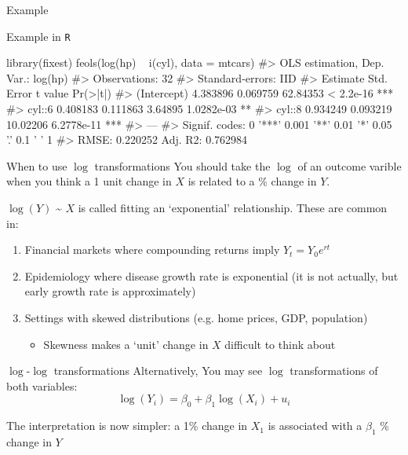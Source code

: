 \documentclass[aspectratio=169,t,11pt,table]{beamer}
\begin{document}


\begin{frame}{Example}

\end{frame}


\begin{frame}{Example in \texttt{R}}
  \begin{codeblock}
library(fixest)
feols(log(hp) ~ i(cyl), data = mtcars)
#> OLS estimation, Dep. Var.: log(hp)
#> Observations: 32
#> Standard-errors: IID 
#>             Estimate Std. Error  t value   Pr(>|t|)    
#> (Intercept) 4.383896   0.069759 62.84353  < 2.2e-16 ***
#> cyl::6      0.408183   0.111863  3.64895 1.0282e-03 ** 
#> cyl::8      0.934249   0.093219 10.02206 6.2778e-11 ***
#> ---
#> Signif. codes:  0 '***' 0.001 '**' 0.01 '*' 0.05 '.' 0.1 ' ' 1
#> RMSE: 0.220252   Adj. R2: 0.762984
  \end{codeblock}
\end{frame}


\begin{frame}{When to use $\log$ transformations}
  You should take the $\log$ of an outcome varible when you think a 1 unit change in $X$ is related to a \% change in $Y$. 

  \pause
  \bigskip
  $\log(Y)$ \textasciitilde{} $X$ is called fitting an `exponential' relationship. These are common in:
  \begin{enumerate}
    \item Financial markets where compounding returns imply $Y_t = Y_0 e^{rt}$
    
    \item Epidemiology where disease growth rate is exponential (it is not actually, but early growth rate is approximately)
    
    \pause
    \item Settings with skewed distributions (e.g. home prices, GDP, population)
    \begin{itemize}
      \item Skewness makes a `unit' change in $X$ difficult to think about
    \end{itemize}
  \end{enumerate}
\end{frame}

\begin{frame}{$\log$-$\log$ transformations}
  Alternatively, You may see $\log$ transformations of both variables:
  $$
    \log(Y_i) = \beta_0 + \beta_1 \log(X_i) + u_i
  $$

  \bigskip
  The interpretation is now simpler: a 1\% change in $X_1$ is associated with a $\beta_1$ \% change in $Y$
\end{frame}
\end{document}
